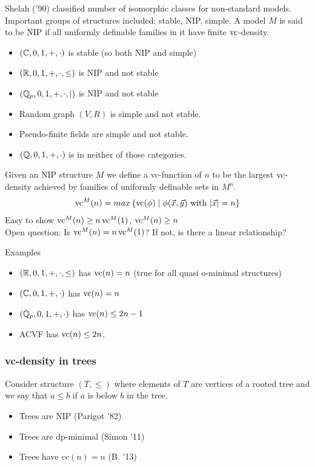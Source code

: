 \documentclass{beamer}
\newcommand{\curly}[1]{\left\{ #1 \right\}}
\begin{document}
\begin{frame}
	Shelah ('90) classified number of isomorphic classes for non-standard models.
	Important groups of structures included: stable, NIP, simple.
	A model $M$ is said to be NIP if all uniformly definable families in it have finite $\operatorname{vc}$-density.
	\begin{itemize}
		\item $(\mathbb{C}, 0, 1, +, \cdot)$ is stable (so both NIP and simple)
		\item $(\mathbb{R}, 0, 1, +, \cdot, \leq)$ is NIP and not stable
		\item $(\mathbb{Q}_p, 0, 1, +, \cdot, \mid)$ is NIP and not stable
		\item Random graph $(V, R)$ is simple and not stable.
		\item Pseudo-finite fields are simple and not stable.
		\item $(\mathbb{Q}, 0, 1, +, \cdot)$ is in neither of those categories.
	\end{itemize}
\end{frame}

\begin{frame}
	Given an NIP structure $M$ we define a vc-function of $n$ to be the largest $\operatorname{vc}$-density achieved by families of uniformly definable sets in $M^n$.
	\begin{align*}
		\vc^M(n) = max \curly{ \vc(\phi) \mid \phi(\vec x, \vec y) \text{ with } |\vec x| = n}
	\end{align*}
	Easy to show $\operatorname{vc}^M(n) \geq n \operatorname{vc}^M(1)$, $\operatorname{vc}^M(n) \geq n$ \\
	Open question: Is $\operatorname{vc}^M(n) = n \operatorname{vc}^M(1)$? If not, is there a linear relationship?
\end{frame}

\begin{frame}
	Examples
	\begin{itemize}
		\item $(\mathbb{R}, 0, 1, +, \cdot, \leq)$ has $\operatorname{vc}(n) = n$ (true for all quasi o-minimal structures)
		\item $(\mathbb{C}, 0, 1, +, \cdot)$ has $\operatorname{vc}(n) = n$
		\item $(\mathbb{Q}_p, 0, 1, +, \cdot)$ has $\operatorname{vc}(n) \leq 2n - 1$
		\item ACVF has $\operatorname{vc}(n) \leq 2n$.
	\end{itemize}
\end{frame}

\begin{frame}
	\frametitle{vc-density in trees}
	Consider structure $(T, \leq)$ where elements of $T$ are vertices of a rooted tree and we say that $a \leq b$ if $a$ is below $b$ in the tree.
	\begin{itemize}
		\item Trees are NIP (Parigot '82)
		\item Trees are dp-minimal (Simon '11)
		\item Trees have $vc(n) = n$ (B. '13)
	\end{itemize}
\end{frame}
\end{document}
